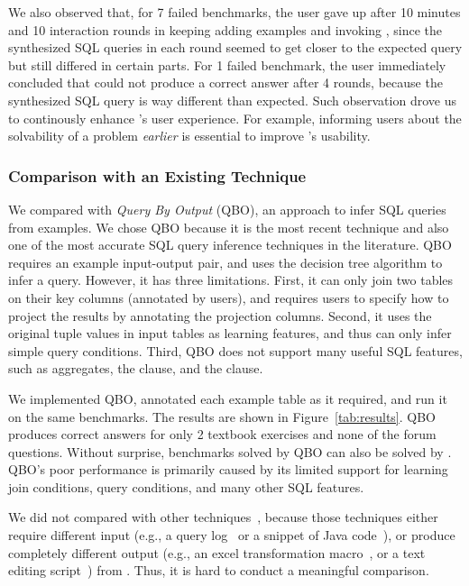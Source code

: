 We also observed that,
for 7 failed benchmarks, the user
gave up after 10 minutes and
10 interaction rounds in keeping adding
examples and invoking \ourtool, since the synthesized
SQL queries in each round seemed to get closer to the expected
query but still differed in certain parts.
For 1 failed benchmark, the user immediately
concluded that \ourtool could not produce a correct
answer after 4 rounds, because the synthesized SQL
query is way different than expected.
Such observation drove us to
continously enhance \ourtool's user experience.
For example, informing users about the solvability of a problem
\textit{earlier} is essential
to improve \ourtool's usability.



\subsubsection{Comparison with an Existing Technique}
\label{sec:comparison}
We compared \ourtool with \textit{Query By Output} (QBO), an
approach to infer SQL queries~\cite{Tran:2009} from examples.
We chose QBO because it is the most recent technique and also one
of the most accurate SQL query inference techniques in
the literature. QBO requires an example input-output pair, and
uses the decision tree algorithm to infer a query.
However, it
has three limitations. First, 
it can only join two tables on their key columns (annotated by users), and requires
users to specify how to project the results
by annotating the projection columns.
Second, it uses the original tuple values
in input tables as learning features, and thus can only
infer simple query conditions. Third, QBO does not support
many useful SQL features, such as aggregates, the 
clause, and the  clause.

We implemented QBO, annotated
each example table as it required, and run it
on the same benchmarks. The results are shown in Figure~\ref{tab:results}.
QBO produces correct answers
for only 2 textbook exercises and none of the forum questions.
Without surprise, 
benchmarks solved by QBO can also be solved by \ourtool.
QBO's poor performance is primarily caused by its
limited support for learning join conditions,
query conditions, and many other SQL features.

We did not compared \ourtool with other techniques~\cite{Howe:2011,
abs-1208-2013, Harris:2011, Kandel:2011}, because
those techniques either require different input
(e.g., a query log~\cite{Khoussainova:2010, Howe:2011}
or a snippet of Java code~\cite{abs-1208-2013}), 
or produce completely different
output (e.g., an excel transformation macro~\cite{Harris:2011}, or a
text editing script~\cite{Kandel:2011}) from \ourtool.
Thus, it is hard to conduct a meaningful comparison.

